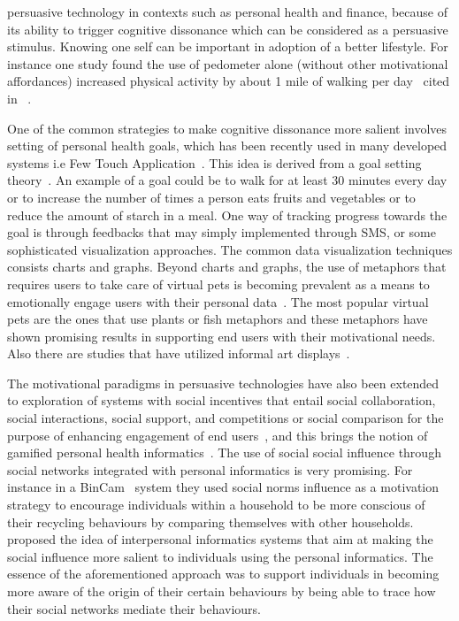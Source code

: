 persuasive technology in contexts such as personal health and finance, because of its ability to trigger cognitive dissonance which can be considered as a persuasive stimulus. Knowing one self can be important in adoption of a better lifestyle. For instance one study found the use of pedometer alone (without other motivational affordances) increased physical activity by about 1 mile of walking per day~\citep{bravata2007using} cited in ~\cite{albaina2009flowie}.  

One of the common strategies to make cognitive dissonance more salient involves setting of personal health goals, which has been recently used in many developed systems i.e Few Touch Application~\citep{arsand:mobile}. This idea is derived from a goal setting theory~\citep{strecher1995goal}. An example of a goal could be to walk for at least 30 minutes every day or to increase the number of times a person eats fruits and vegetables or to reduce the amount of starch in a meal. One way of tracking progress towards the goal is through feedbacks that may simply implemented through SMS, or some sophisticated visualization approaches. The common data visualization techniques consists charts and graphs. Beyond charts and graphs, the use of metaphors that requires users to take care of virtual pets is becoming prevalent as a means to emotionally engage users with their personal data~\citep{lin2006:fish,albaina2009flowie,klasnja2009:using,pollak2010s,nakajima2013designing}. The most popular virtual pets are the ones that use plants or fish metaphors and these metaphors have shown promising results in supporting end users with their motivational needs. Also there are studies that have utilized informal art displays~\citep{fan2012spark,nakajima2013designing}. 

The motivational paradigms in persuasive technologies have also been extended to exploration of systems with social incentives that entail social collaboration, social interactions, social support, and competitions or social comparison for the purpose of enhancing engagement of end users~\citep{ploderer2014social,chen2016social,epstein2015nobody,reno2016matters}, and this brings the notion of gamified personal health informatics~\citep{lin2006:fish,chen2014healthytogether,han2014designing}. The use of social social influence through social networks integrated with personal informatics is very promising. For instance in a BinCam~\citep{comber2013bincam,comber2013designing} system they used social norms influence as a motivation strategy to encourage individuals within a household to be more conscious of their recycling behaviours by comparing themselves with other households.~\cite{bales2011interpersonal} proposed the idea of interpersonal informatics systems that aim at making the social influence more salient to individuals using the personal informatics. The essence of the aforementioned approach was to support individuals in becoming more aware of the origin of their certain behaviours by being able to trace how their social networks mediate their behaviours.

